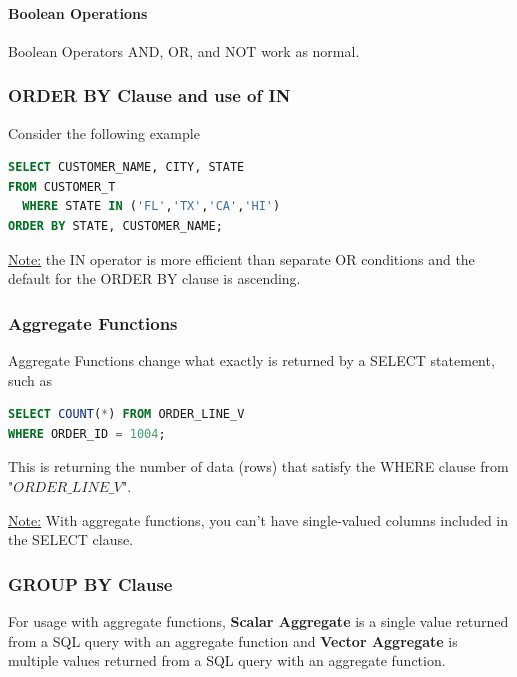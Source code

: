 \documentclass[12pt]{article}
\begin{document}
\paragraph{Boolean Operations} Boolean Operators AND, OR, and NOT work as normal.

\subsubsection{ORDER BY Clause and use of IN}

Consider the following example

\begin{lstlisting}[language=SQL]
SELECT CUSTOMER_NAME, CITY, STATE
FROM CUSTOMER_T
  WHERE STATE IN ('FL','TX','CA','HI')
ORDER BY STATE, CUSTOMER_NAME;

\end{lstlisting}

\begin{tcolorbox}
	\underline{Note:} the IN operator is more efficient than separate OR conditions and the default for the ORDER BY clause is ascending.
\end{tcolorbox}

\subsubsection{Aggregate Functions}

Aggregate Functions change what exactly is returned by a SELECT statement, such as

\begin{lstlisting}[language=SQL]
SELECT COUNT(*) FROM ORDER_LINE_V
WHERE ORDER_ID = 1004;

\end{lstlisting}

This is returning the number of data (rows) that satisfy the WHERE clause from "$ORDER\_LINE\_V$".

\begin{tcolorbox}
	\underline{Note:} With aggregate functions, you can't have single-valued columns included in the SELECT clause.
\end{tcolorbox}

\subsubsection{GROUP BY Clause}

For usage with aggregate functions, \textbf{Scalar Aggregate} is a single value returned from a SQL query with an aggregate function and \textbf{Vector Aggregate} is multiple values returned from a SQL query with an aggregate function.
\end{document}
